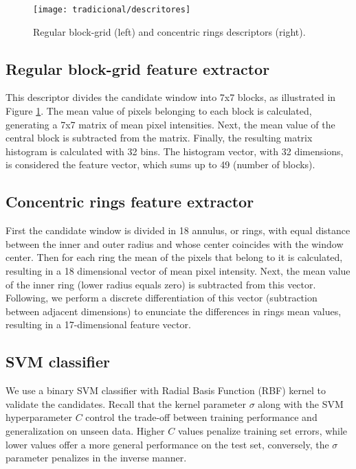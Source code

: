     \begin{figure}
    \centering
    \texttt{[image: tradicional/descritores]}
    \caption{Regular block-grid (left) and concentric rings descriptors (right).}
    \label{fig:descriptors}
    \end{figure}

    \subsection{Regular block-grid feature extractor}
      This descriptor divides the candidate window into 7x7 blocks, as illustrated in Figure \ref{fig:descriptors}. The mean value of pixels belonging to each block is calculated, generating a 7x7 matrix of mean pixel intensities. Next, the mean value of the central block is subtracted from the matrix. Finally, the resulting matrix histogram is calculated with 32 bins. The histogram vector, with 32 dimensions, is considered the feature vector, which sums up to 49 (number of blocks).

    \subsection{Concentric rings feature extractor}
       First the candidate window is divided in 18 annulus, or rings, with equal distance between the inner and outer radius and whose center coincides with the window center. Then for each ring the mean of the pixels that belong to it is calculated, resulting in a 18 dimensional vector of mean pixel intensity. Next, the mean value of the inner ring (lower radius equals zero) is subtracted from this vector. Following, we perform a discrete differentiation of this vector (subtraction between adjacent dimensions) to enunciate the differences in rings mean values, resulting in a 17-dimensional feature vector.

    \subsection{SVM classifier}
      We use a binary SVM classifier with Radial Basis Function (RBF) kernel \cite{rbfkernel} to validate the candidates. Recall that the kernel parameter $\sigma$ along with the SVM hyperparameter $C$ control the trade-off between training performance and generalization on unseen data. Higher $C$ values penalize training set errors, while lower values offer a more general performance on the test set, conversely, the $\sigma$ parameter penalizes in the inverse manner.

